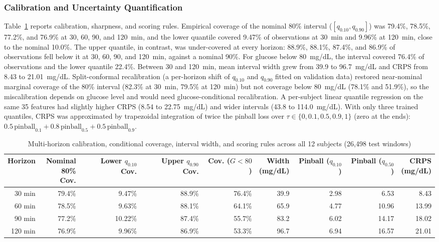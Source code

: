 \documentclass[journal]{IEEEtran}
\begin{document}
\subsubsection{Calibration and Uncertainty Quantification}
Table~\ref{tab:calibration} reports calibration, sharpness, and scoring rules. Empirical coverage of the nominal 80\% interval ($[q_{0.10}, q_{0.90}]$) was 79.4\%, 78.5\%, 77.2\%, and 76.9\% at 30, 60, 90, and 120~min, and the lower quantile covered 9.47\% of observations at 30~min and 9.96\% at 120~min, close to the nominal 10.0\%. The upper quantile, in contrast, was under-covered at every horizon: 88.9\%, 88.1\%, 87.4\%, and 86.9\% of observations fell below it at 30, 60, 90, and 120~min, against a nominal 90\%. For glucose below 80~mg/dL, the interval covered 76.4\% of observations and the lower quantile 22.4\%. Between 30 and 120~min, mean interval width grew from 39.9 to 96.7~mg/dL and CRPS from 8.43 to 21.01~mg/dL. Split-conformal recalibration (a per-horizon shift of $q_{0.10}$ and $q_{0.90}$ fitted on validation data) restored near-nominal marginal coverage of the 80\% interval (82.3\% at 30~min, 79.5\% at 120~min) but not coverage below 80~mg/dL (78.1\% and 51.9\%), so the miscalibration depends on glucose level and would need glucose-conditional recalibration. A per-subject linear quantile regression on the same 35 features had slightly higher CRPS (8.54 to 22.75~mg/dL) and wider intervals (43.8 to 114.0~mg/dL). With only three trained quantiles, CRPS was approximated by trapezoidal integration of twice the pinball loss over $\tau \in \{0, 0.1, 0.5, 0.9, 1\}$ (zero at the ends): $0.5\,\text{pinball}_{0.1} + 0.8\,\text{pinball}_{0.5} + 0.5\,\text{pinball}_{0.9}$.

\begin{table}[t]
\centering
\caption{Multi-horizon calibration, conditional coverage, interval width, and scoring rules across all 12 subjects (26,498 test windows)}
\label{tab:calibration}
\footnotesize
\begin{tabular}{rrrrrrrrr}
\toprule
Horizon & \makecell{Nominal\\80\% Cov.} & \makecell{Lower\\$q_{0.10}$ Cov.} & \makecell{Upper\\$q_{0.90}$ Cov.} & \makecell{Cov.\\($G<80$)} & \makecell{Width\\(mg/dL)} & \makecell{Pinball\\($q_{0.10}$)} & \makecell{Pinball\\($q_{0.50}$)} & \makecell{CRPS\\(mg/dL)} \\
\midrule
30 min  & 79.4\% & 9.47\%  & 88.9\% & 76.4\% & 39.9 & 2.98 & 6.53  & 8.43 \\
60 min  & 78.5\% & 9.63\%  & 88.1\% & 64.1\% & 65.9 & 4.77 & 10.96 & 13.99 \\
90 min  & 77.2\% & 10.22\% & 87.4\% & 55.7\% & 83.2 & 6.02 & 14.17 & 18.02 \\
120 min & 76.9\% & 9.96\%  & 86.9\% & 53.3\% & 96.7 & 6.94 & 16.57 & 21.01 \\
\bottomrule
\end{tabular}
\end{table}
\end{document}
